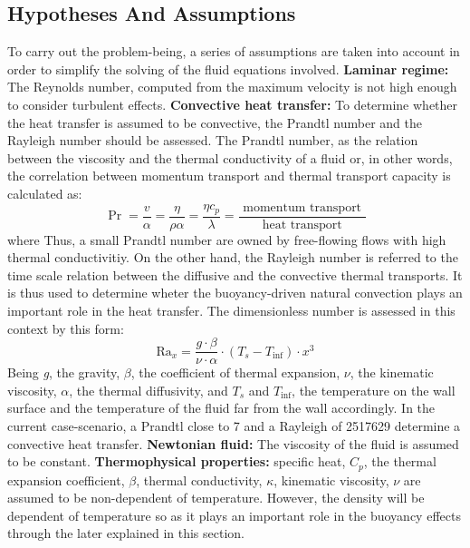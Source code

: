 \subsection{Hypotheses And Assumptions}
To carry out the problem-being, a series of assumptions are taken into account in order to simplify the solving of the fluid equations involved.
\newline
\textbf{Laminar regime:} The Reynolds number, computed from the maximum velocity is not high enough to consider turbulent effects. 
\newline
\textbf{Convective heat transfer:} To determine whether the heat transfer is assumed to be convective, the Prandtl number and the Rayleigh number should be assessed.
\newline
The Prandtl number, as the relation between the viscosity and the thermal conductivity of a fluid or, in other words, the correlation between momentum transport and thermal transport capacity is calculated as:
\begin{equation}
\operatorname{Pr}=\frac{v}{\alpha}=\frac{\eta}{\rho \alpha}=\frac{\eta c_{p}}{\lambda}=\frac{\text { momentum transport }}{\text { heat transport }}
\label{3.3}
\end{equation}
where
Thus, a small Prandtl number are owned by free-flowing flows with high thermal conductivitiy.
\newline
On the other hand, the Rayleigh number is referred to the time scale relation between the diffusive and the convective thermal transports. It is thus used to determine wheter the buoyancy-driven natural convection plays an important role in the heat transfer. The dimensionless number is assessed in this context by this form:
\begin{equation}
\mathrm{Ra}_{x}=\frac{g \cdot \beta}{\nu \cdot \alpha} \cdot\left(T_{s}-T_{\mathrm{inf}}\right) \cdot x^{3}
\label{3.4}
\end{equation}
Being \textit{g}, the gravity, \textit{$\beta$}, the coefficient of thermal expansion, \textit{$\nu$}, the kinematic viscosity, \textit{$\alpha$}, the thermal diffusivity, and \textit{$T_{s}$} and \textit{$T_{\mathrm{inf}}$}, the temperature on the wall surface and the temperature of the fluid far from the wall accordingly.
\newline
In the current case-scenario, a Prandtl close to 7 and a Rayleigh of 2517629 determine a convective heat transfer.
\newline
\textbf{Newtonian fluid:} The viscosity of the fluid is assumed to be constant.
\newline
\textbf{Thermophysical properties:} specific heat, \textit{$C_p$}, the thermal expansion coefficient, \textit{$\beta$}, thermal conductivity, \textit{$\kappa$}, kinematic viscosity, \textit{$\nu$} are assumed to be non-dependent of temperature. However, the density will be dependent of temperature so as it plays an important role in the buoyancy effects through the later explained in this section.

